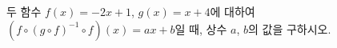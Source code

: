 두 함수 $f(x)=-2x+1$, $g(x)=x+4$에 대하여 $(f\circ(g\circ f)^{-1}\circ f)(x)=ax+b$일 때, 상수 $a$, $b$의 값을 구하시오.
